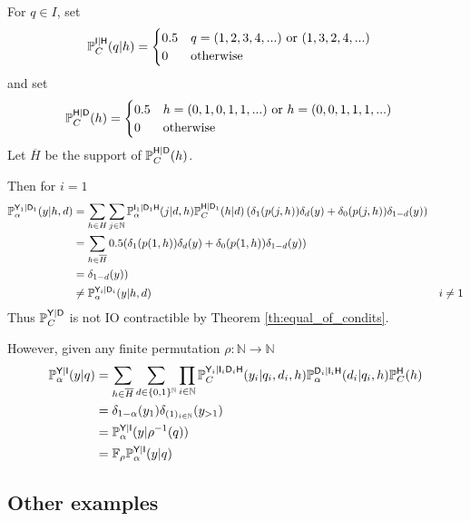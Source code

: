 \begin{example}
For $q\in I$, set
\begin{align}
    \mathbb{P}_C^{\mathsf{I}|\mathsf{H}}(q|h)&= \begin{cases}
        0.5 & q=(1,2,3,4,...) \text{ or } (1,3,2,4,...)\\
        0&\text{otherwise}
    \end{cases}
\end{align}
and set
\begin{align}
    \mathbb{P}_C^{\mathsf{H}|\mathsf{D}}(h) &= \begin{cases}
        0.5 & h=(0,1,0,1,1,...)\text{ or }h=(0,0,1,1,1,...)\\
        0 &\text{otherwise}
    \end{cases}
\end{align}
Let $\overline{H}$ be the support of $\mathbb{P}_C^{\mathsf{H}|\mathsf{D}}(h)$.

Then for $i=1$
\begin{align}
    \mathbb{P}_\alpha^{\mathsf{Y}_1|\mathsf{D}_1}(y|h,d) &= \sum_{h\in H} \sum_{j\in \mathbb{N}} \mathbb{P}_\alpha^{\mathsf{I}_1|\mathsf{D}_1\mathsf{H}}(j|d,h)\mathbb{P}_C^{\mathsf{H}|\mathsf{D}_1}(h|d)\left(\delta_1(p(j,h))\delta_d(y) + \delta_0(p(j,h))\delta_{1-d}(y)\right)\\
    &= \sum_{h\in \overline{H}} 0.5( \delta_1(p(1,h))\delta_d(y) + \delta_0(p(1,h))\delta_{1-d}(y))\\
    &= \delta_{1-d}(y))\\
    &\neq  \mathbb{P}_\alpha^{\mathsf{Y}_i|\mathsf{D}_i}(y|h,d) & i\neq 1
\end{align}
Thus $\mathbb{P}_C^{\mathsf{Y}|\mathsf{D}}$ is not IO contractible by Theorem \ref{th:equal_of_condits}. 

However, given any finite permutation $\rho:\mathbb{N}\to\mathbb{N}$
\begin{align}
    \mathbb{P}_\alpha^{\mathsf{Y}|\mathsf{I}}(y|q) &= \sum_{h\in \overline{H}}\sum_{d\in\{0,1\}^{\mathbb{N}}} \prod_{i\in \mathbb{N}} \mathbb{P}_C^{\mathsf{Y}_i|\mathsf{I}_i\mathsf{D}_i\mathsf{H}}(y_i|q_i,d_i,h) \mathbb{P}_\alpha^{\mathsf{D}_i|\mathsf{I}_i\mathsf{H}}(d_i|q_i,h)\mathbb{P}_C^{\mathsf{H}}(h)\\
    &= \delta_{1-\alpha}(y_1)\delta_{(1)_{i\in\mathbb{N}}}(y_{>1})\\
    &= \mathbb{P}_\alpha^{\mathsf{Y}|\mathsf{I}}(y|\rho^{-1}(q))\\
    &= \mathbb{F}_{\rho}\mathbb{P}_\alpha^{\mathsf{Y}|\mathsf{I}}(y|q)
\end{align}
\end{example}

\subsection{Other examples}

